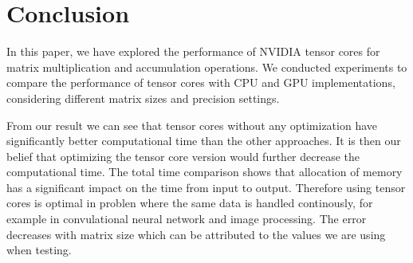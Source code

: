 \documentclass[conference]{IEEEtran}
\begin{document}
  \section{Conclusion}\label{sec:conclusion}
  
  In this paper, we have explored the performance of NVIDIA tensor cores for matrix multiplication and accumulation operations. 
  We conducted experiments to compare the performance of tensor cores with CPU and GPU implementations, 
  considering different matrix sizes and precision settings.

  From our result we can see that tensor cores without any optimization have significantly better computational time
  than the other approaches. It is then our belief that optimizing the tensor core version would further 
  decrease the computational time. The total time comparison shows that allocation of memory has a significant
  impact on the time from input to output. Therefore using tensor cores is optimal in problen where the same data is
  handled continously, for example in convulational neural network and image processing. The error decreases
  with matrix size which can be attributed to the values we are using when testing. 

  



\end{document}
